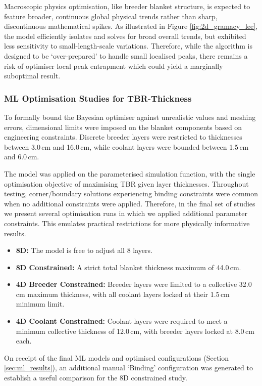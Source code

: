 \documentclass[11pt]{article}
\begin{document}
Macroscopic physics optimisation, like breeder blanket structure, is expected to feature broader,
continuous global physical trends rather than sharp, discontinuous mathematical spikes. As
illustrated in Figure \ref{fig:2d_gramacy_lee}, the model efficiently isolates and solves for broad
overall trends, but exhibited less sensitivity to small-length-scale variations. Therefore, while
the algorithm is designed to be `over-prepared' to handle small localised peaks, there remains a
risk of optimiser local peak entrapment which could yield a marginally suboptimal result.

\subsubsection{ML Optimisation Studies for TBR-Thickness}
\label{sec:ml_runs}
To formally bound the Bayesian optimiser against unrealistic values and meshing errors, dimensional
limits were imposed on the blanket components based on engineering constraints. Discrete breeder
layers were restricted to thicknesses between 3.0\,cm and 16.0\,cm, while coolant layers were
bounded between 1.5\,cm and 6.0\,cm.

The model was applied on the parameterised simulation function, with the single optimisation
objective of maximising TBR given layer thicknesses. Throughout testing, corner/boundary solutions
experiencing binding constraints were common when no additional constraints were applied. Therefore,
in the final set of studies we present several optimisation runs in which we applied additional
parameter constraints. This emulates practical restrictions for more physically informative results.
\begin{itemize}
    \item \textbf{8D:} The model is free to adjust all 8 layers.
    \item \textbf{8D Constrained:} A strict total blanket thickness maximum of 44.0\,cm.
    \item \textbf{4D Breeder Constrained:} Breeder layers were limited to a collective 32.0\,cm
    maximum thickness, with all coolant layers locked at their 1.5\,cm minimum limit.
    \item \textbf{4D Coolant Constrained:} Coolant layers were required to meet a minimum collective
    thickness of 12.0\,cm, with breeder layers locked at 8.0\,cm each.
\end{itemize}

On receipt of the final ML models and optimised configurations (Section \ref{sec:ml_results}), an
additional manual `Binding' configuration was generated to establish a useful comparison for the 8D
constrained study.
\end{document}
